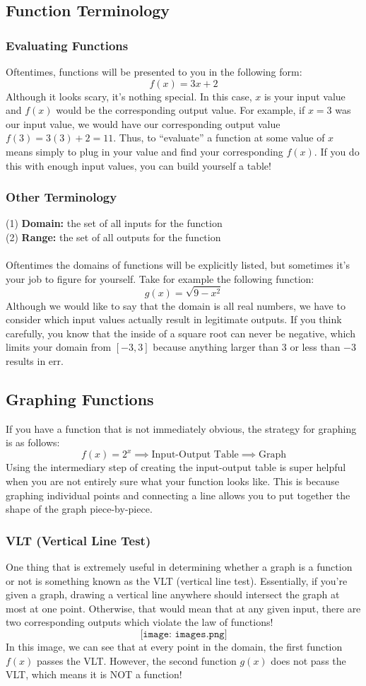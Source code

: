 \subsection{Function Terminology}
\subsubsection{Evaluating Functions}
Oftentimes, functions will be presented to you in the following form:
$$
f(x) = 3x + 2
$$
Although it looks scary, it's nothing special. In this case, $x$ is your input value and $f(x)$ would be the corresponding output value. For example, if $x = 3$ was our input value, we would have our corresponding output value $f(3) = 3(3) + 2 = 11$. Thus, to ``evaluate'' a function at some value of $x$ means simply to plug in your value and find your corresponding $f(x)$. If you do this with enough input values, you can build yourself a table!
\subsubsection{Other Terminology}
(1) \textbf{Domain:} the set of all inputs for the function\\
(2) \textbf{Range:} the set of all outputs for the function\\
\\
Oftentimes the domains of functions will be explicitly listed, but sometimes it's your job to figure for yourself. Take for example the following function:
$$
g(x) = \sqrt{9-x^2} 
$$
Although we would like to say that the domain is all real numbers, we have to consider which input values actually result in legitimate outputs. If you think carefully, you know that the inside of a square root can never be negative, which limits your domain from $[-3,3]$ because anything larger than $3$ or less than $-3$ results in err.
\subsection{Graphing Functions}
If you have a function that is not immediately obvious, the strategy for graphing is as follows:
$$
f(x) = 2^x \implies \text{Input-Output Table} \implies \text{Graph}
$$
Using the intermediary step of creating the input-output table is super helpful when you are not entirely sure what your function looks like. This is because graphing individual points and connecting a line allows you to put together the shape of the graph piece-by-piece.
\subsubsection{VLT (Vertical Line Test)}
One thing that is extremely useful in determining whether a graph is a function or not is something known as the VLT (vertical line test). Essentially, if you're given a graph, drawing a vertical line anywhere should intersect the graph at most at one point. Otherwise, that would mean that at any given input, there are two corresponding outputs which violate the law of functions!
$$
\texttt{[image: images.png]}
$$
In this image, we can see that at every point in the domain, the first function $f(x)$ passes the VLT. However, the second function $g(x)$ does not pass the VLT, which means it is NOT a function! 
\pagebreak
